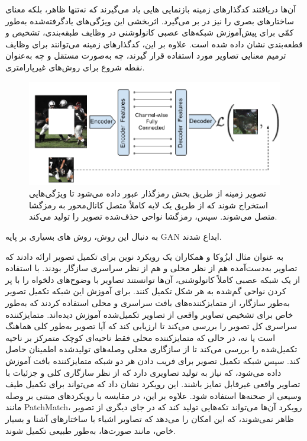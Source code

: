 آن‌ها دریافتند  کدگذارهای زمینه بازنمایی هایی یاد می‌گیرند که نه‌تنها ظاهر، بلکه معنای ساختارهای بصری را نیز در بر می‌گیرد. اثربخشی این ویژگی‌های یادگرفته‌شده به‌طور کمّی برای پیش‌آموزش شبکه‌های عصبی کانولوشنی در وظایف طبقه‌بندی، تشخیص و قطعه‌بندی نشان داده شده است. علاوه بر این، کدگذارهای زمینه می‌توانند برای وظایف ترمیم معنایی تصاویر مورد استفاده قرار گیرند، چه به‌صورت مستقل و چه به‌عنوان نقطه شروع برای روش‌های غیرپارامتری.
\begin{figure}
	\centering
	\includegraphics[width=0.7\linewidth]{figs/contextencodersArchitecture}
	\caption[معماری کلی Context Encoders]{
	تصویر زمینه از طریق بخش رمزگذار عبور داده می‌شود تا ویژگی‌هایی استخراج شوند که از طریق یک لایه کاملاً متصل کانال‌محور به رمزگشا متصل می‌شوند. سپس، رمزگشا نواحی حذف‌شده تصویر را تولید می‌کند.}
	\label{fig:contextencodersarchitecture}
\end{figure}

به دنبال این روش، روش های بسیاری بر پایه GAN ابداع شدند. 
\cite{caoLearningSketchTensor2021}
\cite{guoImageInpaintingConditional2024}
\cite{liRecurrentFeatureReasoning2020}
\cite{nazeriEdgeConnectGenerativeImage2019}
\cite{pengGeneratingDiverseStructure2021}

به عنوان مثال ایزُوکا و همکاران یک رویکرد نوین برای تکمیل تصویر ارائه دادند
\cite{iizukaGloballyLocallyConsistent2017}
که تصاویر به‌دست‌آمده هم از نظر محلی و هم از نظر سراسری سازگار بودند. با استفاده از یک شبکه عصبی کاملاً کانولوشنی، آن‌ها توانستند تصاویر با وضوح‌های دلخواه را با پر کردن نواحی گم‌شده به هر شکل تکمیل کنند. برای آموزش این شبکه تکمیل تصویر به‌طور سازگار، از متمایزکننده‌های بافت سراسری و محلی استفاده کردند که به‌طور خاص برای تشخیص تصاویر واقعی از تصاویر تکمیل‌شده آموزش دیده‌اند. متمایزکننده سراسری کل تصویر را بررسی می‌کند تا ارزیابی کند که آیا تصویر به‌طور کلی هماهنگ است یا نه، در حالی که متمایزکننده محلی فقط ناحیه‌ای کوچک متمرکز بر ناحیه تکمیل‌شده را بررسی می‌کند تا از سازگاری محلی وصله‌های تولیدشده اطمینان حاصل کند. سپس شبکه تکمیل تصویر برای فریب دادن هر دو شبکه متمایزکننده بافت آموزش داده می‌شود، که نیاز به تولید تصاویری دارد که از نظر سازگاری کلی و جزئیات با تصاویر واقعی غیرقابل تمایز باشند. این رویکرد نشان داد که می‌تواند برای تکمیل طیف وسیعی از صحنه‌ها استفاده شود. علاوه بر این، در مقایسه با رویکردهای مبتنی بر وصله مانند PatchMatch، رویکرد آن‌ها می‌تواند تکه‌هایی تولید کند که در جای دیگری از تصویر ظاهر نمی‌شوند، که این امکان را می‌دهد که تصاویر اشیاء با ساختارهای آشنا و بسیار خاص، مانند صورت‌ها، به‌طور طبیعی تکمیل شوند.\\

